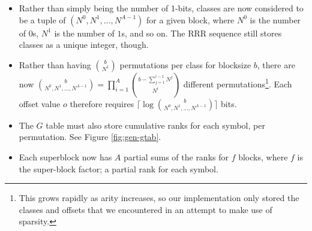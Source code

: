 \begin{itemize}
	\item
		Rather than simply being the number of 1-bits, classes are now 
		considered to be a tuple of $(N^0, N^1, ..., N^{A-1})$ for a given 
		block, where $N^0$ is the number of $0$s, $N^1$ is the number of $1$s, 
		and so on. The RRR sequence still stores classes as a unique integer, 
		though.

	\item
		Rather than having $b \choose N^1$ permutations per class for blocksize 
		$b$, there are now ${b \choose N^0, N^1,...,N^{A-1}} = 
		\prod_{i = 1}^{A} {{b - \sum_{j = 1}^{i - 1} N^j} \choose N^i}
		$ different permutations\footnote{This grows rapidly as arity increases, 
		so our implementation only stored the classes and offsets that we 
		encountered in an attempt to make use of sparsity.}.
		Each offset value $o$ therefore requires $\lceil\log {b \choose N^0, 
		N^1,...,N^{A-1}}\rceil$ bits.

	\item
		The $G$ table must also store cumulative ranks for each symbol, per 
		permutation. See Figure \ref{fig:gen-gtab}.

	\item
		Each superblock now has $A$ partial sums of the ranks for $f$ blocks, 
		where $f$ is the super-block factor; a partial rank for each symbol.
\end{itemize}
